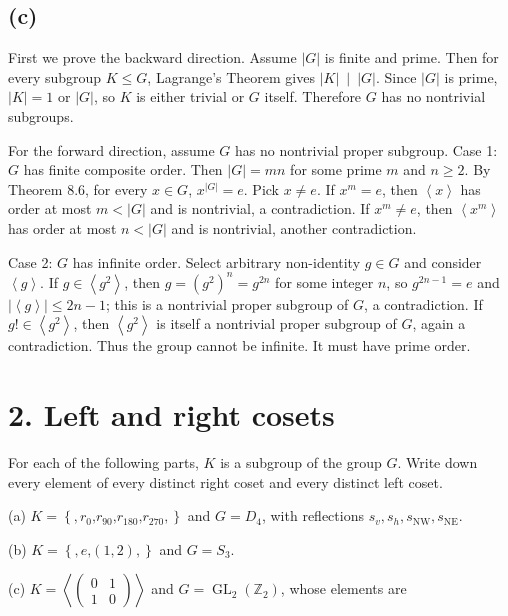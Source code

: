 \subsection{(c)}

First we prove the backward direction. Assume \(|G|\) is finite and prime. Then for every subgroup \(K \leq G\), Lagrange's Theorem gives \(\left. |K|\  \middle| \ |G| \right.\). Since \(|G|\) is prime, \(|K| = 1\) or \(|G|\), so \(K\) is either trivial or \(G\) itself. Therefore \(G\) has no nontrivial subgroups.

For the forward direction, assume \(G\) has no nontrivial proper subgroup. Case 1: \(G\) has finite composite order. Then \(|G| = mn\) for some prime \(m\) and \(n \geq 2\). By Theorem 8.6, for every \(x \in G\), \(x^{|G|} = e\). Pick \(x \neq e\). If \(x^{m} = e\), then \(\left\langle x \right\rangle\) has order at most \(m < |G|\) and is nontrivial, a contradiction. If \(x^{m} \neq e\), then \(\left\langle x^{m} \right\rangle\) has order at most \(n < |G|\) and is nontrivial, another contradiction.

Case 2: \(G\) has infinite order. Select arbitrary non-identity \(g \in G\) and consider \(\left\langle g \right\rangle\). If \(g \in \left\langle g^{2} \right\rangle\), then \(g = \left( g^{2} \right)^{n} = g^{2n}\) for some integer \(n\), so \(g^{2n - 1} = e\) and \(\left| \left\langle g \right\rangle \right| \leq 2n - 1\); this is a nontrivial proper subgroup of \(G\), a contradiction. If \(g! \in \left\langle g^{2} \right\rangle\), then \(\left\langle g^{2} \right\rangle\) is itself a nontrivial proper subgroup of \(G\), again a contradiction. Thus the group cannot be infinite. It must have prime order.

\section{2. Left and right cosets}

For each of the following parts, \(K\) is a subgroup of the group \(G\). Write down every element of every distinct right coset and every distinct left coset.

(a) \(K = \left\{ {,r_{0}\text{,}r_{90}\text{,}r_{180}\text{,}r_{270},} \right\}\) and \(G = D_{4}\), with reflections \(s_{v},s_{h},s_{\text{NW}},s_{\text{NE}}\).

(b) \(K = \left\{ {,e\text{,}\left( {1,2} \right),} \right\}\) and \(G = S_{3}\).

(c) \(K = \left\langle \begin{pmatrix}
0 & 1 \\
1 & 0
\end{pmatrix} \right\rangle\) and \(G = \operatorname{GL}_{2}\left( \mathbb{Z}_{2} \right)\), whose elements are

